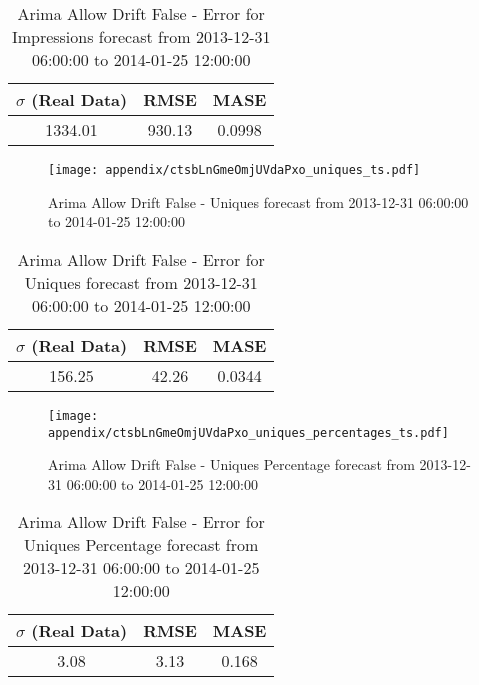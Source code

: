 \begin{table}[H]
\centering
\footnotesize
\begin{tabular}{ccc}
$\sigma$ (Real Data) & RMSE & MASE   \\ \hline
1334.01 & 930.13 & 0.0998 \\
\end{tabular}

\vspace{0.5cm}

\caption[]{
Arima Allow Drift False - Error for Impressions forecast from 2013-12-31 06:00:00 to 2014-01-25 12:00:00}
\end{table}

\begin{figure}[H] \begin{center} \leavevmode
\texttt{[image: appendix/ctsbLnGmeOmjUVdaPxo\_uniques\_ts.pdf]} \caption[]{
Arima Allow Drift False - Uniques forecast from 2013-12-31 06:00:00 to 2014-01-25 12:00:00} \label{fig:appendix/ctsbLnGmeOmjUVdaPxo_uniques_ts.pdf} \end{center}
\end{figure}

\begin{table}[H]
\centering
\footnotesize
\begin{tabular}{ccc}
$\sigma$ (Real Data) & RMSE & MASE   \\ \hline
156.25 & 42.26 & 0.0344 \\
\end{tabular}

\vspace{0.5cm}

\caption[]{
Arima Allow Drift False - Error for Uniques forecast from 2013-12-31 06:00:00 to 2014-01-25 12:00:00}
\end{table}

\begin{figure}[H] \begin{center} \leavevmode
\texttt{[image: appendix/ctsbLnGmeOmjUVdaPxo\_uniques\_percentages\_ts.pdf]} \caption[]{
Arima Allow Drift False - Uniques Percentage forecast from 2013-12-31 06:00:00 to 2014-01-25 12:00:00} \label{fig:appendix/ctsbLnGmeOmjUVdaPxo_uniques_percentages_ts.pdf} \end{center}
\end{figure}

\begin{table}[H]
\centering
\footnotesize
\begin{tabular}{ccc}
$\sigma$ (Real Data) & RMSE & MASE   \\ \hline
3.08 & 3.13 & 0.168 \\
\end{tabular}

\vspace{0.5cm}

\caption[]{
Arima Allow Drift False - Error for Uniques Percentage forecast from 2013-12-31 06:00:00 to 2014-01-25 12:00:00}
\end{table}

